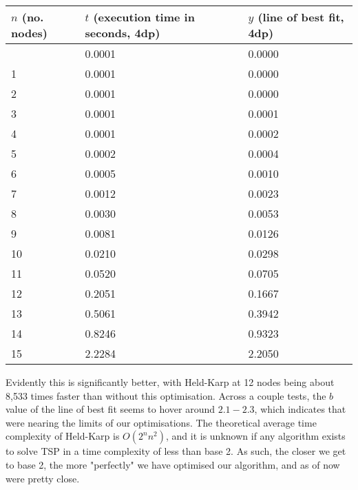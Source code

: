 \documentclass[
]{article}
\begin{document}
\begin{longtable}[]{@{}lll@{}}
\toprule\noalign{}
{\(n\)} (no. nodes) & {\(t\)} (execution time in seconds, 4dp) & {\(y\)}
(line of best fit, 4dp) \\
\midrule\noalign{}
\endhead
\bottomrule\noalign{}
\endlastfoot
0 & 0.0001 & 0.0000 \\
1 & 0.0001 & 0.0000 \\
2 & 0.0001 & 0.0000 \\
3 & 0.0001 & 0.0001 \\
4 & 0.0001 & 0.0002 \\
5 & 0.0002 & 0.0004 \\
6 & 0.0005 & 0.0010 \\
7 & 0.0012 & 0.0023 \\
8 & 0.0030 & 0.0053 \\
9 & 0.0081 & 0.0126 \\
10 & 0.0210 & 0.0298 \\
11 & 0.0520 & 0.0705 \\
12 & 0.2051 & 0.1667 \\
13 & 0.5061 & 0.3942 \\
14 & 0.8246 & 0.9323 \\
15 & 2.2284 & 2.2050 \\
\end{longtable}

Evidently this is significantly better, with Held-Karp at 12 nodes being
about 8,533 times faster than without this optimisation. Across a couple
tests, the {\(b\)} value of the line of best fit seems to hover around
{\(2.1 - 2.3\)}, which indicates that we\textquotesingle re nearing the
limits of our optimisations. The theoretical average time complexity of
Held-Karp is {\(O(2^{n}n^{2})\)}, and it is unknown if any algorithm
exists to solve TSP in a time complexity of less than base 2. As such,
the closer we get to base 2, the more "perfectly" we have optimised our
algorithm, and as of now we\textquotesingle re pretty close.
\end{document}
